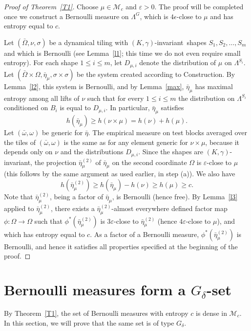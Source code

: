\documentclass{amsart}
\theoremstyle{remark}
\def \M {\mathcal M}
\def \eps {\varepsilon}
\def \inv {invariant}
\begin{document}
\begin{proof}[Proof of Theorem~\ref{T1}]
Choose $\mu\in\M_c$ and $\eps>0$. The proof will be completed once we construct a Bernoulli measure on $\Lambda^G$, which is $4\epsilon$-close to $\mu$ and has entropy equal to $c$.

Let $(\bar\Omega,\nu,\sigma)$ be a dynamical tiling with $(K,\gamma)$-\inv\ shapes $S_1,S_2,\dots,S_m$ and which is Bernoulli (see Lemma~\ref{l1}; this time we do not even require small entropy). For each shape $1\le i\le m$, let $D_{\mu,i}$ denote the distribution of $\mu$ on $\Lambda^{S_i}$. Let $(\bar\Omega\times\Omega,\bar\eta_\mu,\sigma\times\sigma)$ be the system created according to Construction. By Lemma~\ref{l2}, this system is Bernoulli, and by Lemma~\ref{max}, $\bar\eta_\mu$ has maximal entropy among all lifts of $\nu$ such that for every $1\le i\le m$ the distribution on $\Lambda^{S_i}$ conditioned on $B_i$ is equal to $D_{\mu,i}$. In particular, $\bar\eta_\mu$ satisfies 
$$
h(\bar\eta_\mu)\ge h(\nu\times\mu)=h(\nu)+h(\mu).
$$
Let $(\bar\omega,\omega)$ be generic for $\bar\eta$. The empirical measure on test blocks averaged over the tiles of $(\bar\omega,\omega)$ is the same as for any element generic for $\nu\times\mu$, because it depends only on $\nu$ and the distributions $D_{\mu,i}$. Since the shapes are $(K,\gamma)$-\inv, the projection $\bar\eta_\mu^{(2)}$ of $\bar\eta_\mu$ on the second coordinate $\Omega$ is $\eps$-close to $\mu$ (this follows by the same argument as used earlier, in step (a)). We also have 
$$
h(\bar\eta_\mu^{(2)})\ge h(\bar\eta_\mu)-h(\nu)\ge h(\mu)\ge c.
$$
Note that $\bar\eta_\mu^{(2)}$, being a factor of $\bar\eta_\mu$, is Bernoulli (hence free). By Lemma~\ref{l3} applied to $\bar\eta_\mu^{(2)}$, there exists a $\bar\eta_\mu^{(2)}$-almost everywhere defined factor map $\phi:\Omega\to\Omega$ such that $\phi^*(\bar\eta_\mu^{(2)})$ is $3\eps$-close to $\bar\eta_\mu^{(2)}$ (hence $4\eps$-close to $\mu$), and which has entropy equal to $c$. 
As a factor of a Bernoulli measure, $\phi^*(\bar\eta_\mu^{(2)})$ is Bernoulli, and hence it satisfies all properties specified at the beginning of the proof.
\end{proof}

\section{Bernoulli measures form a $G_\delta$-set}\label{S4}

By Theorem~\ref{T1}, the set of Bernoulli measures with entropy $c$ is dense in $\M_c$. In this section, we will prove that the same set is of type $G_\delta$. 
\end{document}
